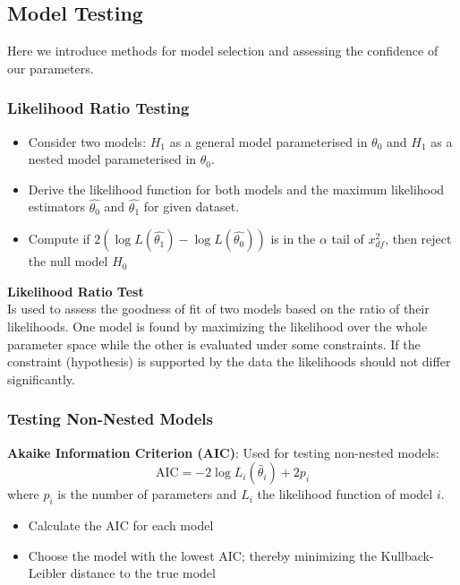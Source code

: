 \documentclass{article}
\begin{document}
\begin{multicols*}{3}
\subsection{Model Testing}

Here we introduce methods for model selection and assessing the confidence of our parameters. 

\subsubsection{Likelihood Ratio Testing}

\begin{itemize}
    \item Consider two models: $H_1$ as a general model parameterised in $\theta_0$ and $H_1$ as a nested model parameterised in $\theta_0$.
    \item Derive the likelihood function for both models and the maximum likelihood estimators $\hat{\theta_0}$ and $\hat{\theta_1}$ for given dataset. 
    \item Compute if $2(\log L (\hat{\theta_1}) - \log L(\hat{\theta_0}))$ is in the $\alpha$ tail of $x_{df}^2$, then reject the null model $H_0$   
\end{itemize}

\begin{mdframed}[backgroundcolor=astral] 
    \textbf{Likelihood Ratio Test}\\
    Is used to assess the goodness of fit of two models based on the ratio of their likelihoods. One model is found by maximizing the likelihood over the whole parameter space while the other is evaluated under some constraints. If the constraint (hypothesis) is supported by the data the likelihoods should not differ significantly.
\end{mdframed}

\subsubsection{Testing Non-Nested Models}

\textbf{Akaike Information Criterion (AIC)}: Used for testing non-nested models:
$$\text{AIC} = -2\log L_i(\hat{\theta}_i) + 2p_i$$
where $p_i$ is the number of parameters and $L_i$ the likelihood function of model $i$.

\begin{itemize}
    \item Calculate the AIC for each model
    \item Choose the model with the lowest AIC; thereby minimizing the Kullback-Leibler distance to the true model  
\end{itemize}


\end{multicols*}
\end{document}
